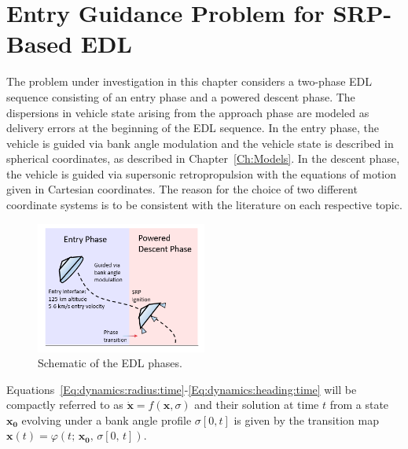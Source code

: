 \section{Entry Guidance Problem for SRP-Based EDL}
The problem under investigation in this chapter considers a two-phase EDL sequence consisting of an entry phase and a powered descent phase. The dispersions in vehicle state arising from the approach phase are modeled as delivery errors at the beginning of the EDL sequence. In the entry phase, the vehicle is guided via bank angle modulation and the vehicle state is described in spherical coordinates, as described in Chapter~\ref{Ch:Models}. In the descent phase, the vehicle is guided via supersonic retropropulsion with the equations of motion given in Cartesian coordinates. The reason for the choice of two different coordinate systems is to be consistent with the literature on each respective topic.
\begin{figure}[h!]
	\centering
	\includegraphics[width=0.5\textwidth]{../AAS20/EDLPhaseDiagram} 
	\caption{Schematic of the EDL phases.}
	\label{fig_phases}
\end{figure}

Equations~\eqref{Eq:dynamics:radius:time}-\eqref{Eq:dynamics:heading:time} will be compactly referred to as $\dot{\mathbf{x}} = f(\mathbf{x},\sigma)$ and their solution at time $t$ from a state $\mathbf{x_0}$ evolving under a bank angle profile $\sigma[0,t]$ is given by the transition map $\mathbf{x}(t) = \varphi(t;\, \mathbf{x_0},\,\sigma[0,\,t])$.

